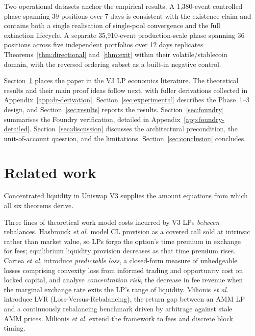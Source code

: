 \documentclass[11pt,a4paper]{article}
\theoremstyle{plain}
\begin{document}
Two operational datasets anchor the empirical results. A 1{,}380-event controlled phase spanning 39 positions over 7 days is consistent with the existence claim and contains both a single realisation of single-pool convergence and the full extinction lifecycle. A separate 35{,}910-event production-scale phase spanning 36 positions across five independent portfolios over 12 days replicates Theorems~\ref{thm:directional} and~\ref{thm:exit} within their volatile/stablecoin domain, with the reversed ordering subset as a built-in negative control.

Section~\ref{sec:related} places the paper in the V3 LP economics literature. The theoretical results and their main proof ideas follow next, with fuller derivations collected in Appendix~\ref{app:dr-derivation}. Section~\ref{sec:experimental} describes the Phase~1--3 design, and Section~\ref{sec:results} reports the results. Section~\ref{sec:foundry} summarises the Foundry verification, detailed in Appendix~\ref{app:foundry-detailed}. Section~\ref{sec:discussion} discusses the architectural precondition, the unit-of-account question, and the limitations. Section~\ref{sec:conclusion} concludes.

\section{Related work}\label{sec:related}

Concentrated liquidity in Uniswap V3\cite{adams2021} supplies the amount equations from which all six theorems derive.

Three lines of theoretical work model costs incurred by V3 LPs \emph{between} rebalances. Hasbrouck \emph{et al.}\cite{hasbrouck2025} model CL provision as a covered call sold at intrinsic rather than market value, so LPs forgo the option's time premium in exchange for fees; equilibrium liquidity provision decreases as that time premium rises. Cartea \emph{et al.}\cite{cartea2024} introduce \emph{predictable loss}, a closed-form measure of unhedgeable losses comprising convexity loss from informed trading and opportunity cost on locked capital, and analyse \emph{concentration risk}, the decrease in fee revenue when the marginal exchange rate exits the LP's range of liquidity. Milionis \emph{et al.}\cite{milionis2022b} introduce LVR (Loss-Versus-Rebalancing), the return gap between an AMM LP and a continuously rebalancing benchmark driven by arbitrage against stale AMM prices. Milionis \emph{et al.}\cite{milionis2024} extend the framework to fees and discrete block timing.
\end{document}
